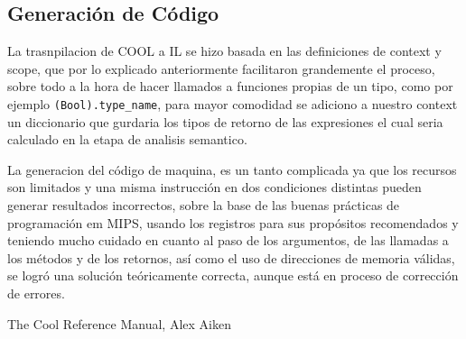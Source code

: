 \documentclass{article}
\begin{document}
\subsection{Generaci\'on de C\'odigo}

La trasnpilacion de COOL a IL se hizo basada en las definiciones de context y scope, que por lo
explicado anteriormente facilitaron grandemente el proceso, sobre todo a la hora de hacer llamados
a funciones propias de un tipo, como por ejemplo \verb|(Bool).type_name|, para mayor comodidad se
adiciono a nuestro context un diccionario que gurdaria los tipos de retorno de las expresiones el cual
seria calculado en la etapa de analisis semantico.

La generacion del c\'odigo de maquina, es un tanto complicada ya que los recursos son limitados y
una misma instrucci\'on en dos condiciones distintas pueden generar resultados incorrectos, sobre la
base de las buenas pr\'acticas de programaci\'on em MIPS, usando los registros para sus prop\'ositos
recomendados y teniendo mucho cuidado en cuanto al paso de los argumentos, de las llamadas a los
m\'etodos y de los retornos, as\'i como el uso de direcciones de memoria v\'alidas, se logr\'o una
soluci\'on te\'oricamente correcta, aunque est\'a en proceso de correcci\'on de errores.

\begin{thebibliography}{99}
	 The Cool Reference Manual, Alex Aiken
\end{thebibliography}

\end{document}
